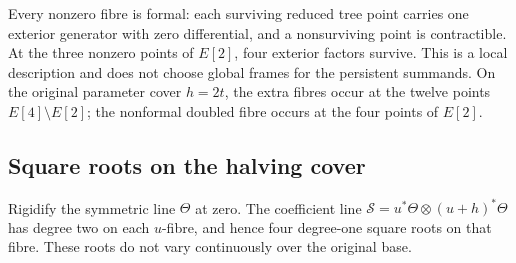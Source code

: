 Every nonzero fibre is formal: each surviving reduced
tree point carries one exterior generator with zero
differential, and a nonsurviving point is contractible.
At the three nonzero points of \(E[2]\), four exterior
factors survive. This is a local description and does
not choose global frames for the persistent summands.
On the original parameter cover \(h=2t\), the extra
fibres occur at the twelve points
\(E[4]\setminus E[2]\); the nonformal doubled fibre
occurs at the four points of \(E[2]\).

\subsection{Square roots on the halving cover}

Rigidify the symmetric line \(\Theta\) at zero.
The coefficient line
\(\mathcal S=u^*\Theta\otimes(u+h)^*\Theta\)
has degree two on each \(u\)-fibre, and hence four
degree-one square roots on that fibre. These roots
do not vary continuously over the original base.

